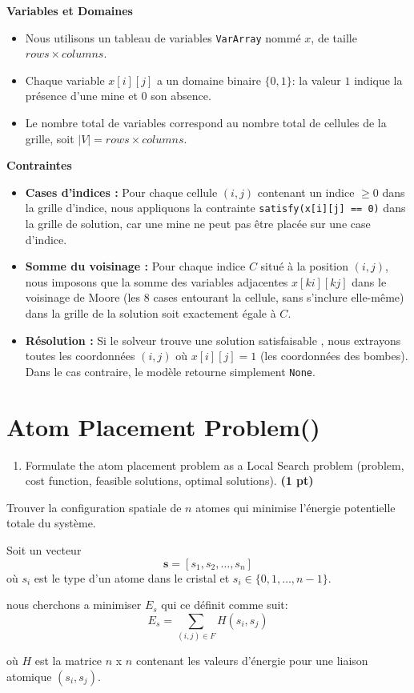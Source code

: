 \documentclass[11pt,a4paper]{report}
\begin{document}
\begin{answers}[10cm]
    \textbf{Variables et Domaines}
    \begin{itemize}
        \item Nous utilisons un tableau de variables \texttt{VarArray} nommé $x$, de taille $rows \times columns$.
        \item Chaque variable $x[i][j]$ a un domaine binaire $\{0, 1\}$: la valeur $1$ indique la présence d'une mine et $0$ son absence.
        \item Le nombre total de variables correspond au nombre total de cellules de la grille, soit $|V| = rows \times columns$.
    \end{itemize}

    \textbf{Contraintes}
    \begin{itemize}
        \item \textbf{Cases d'indices  :} Pour chaque cellule $(i, j)$ contenant un indice $\geq 0$ dans la grille d'indice, nous appliquons la contrainte \texttt{satisfy(x[i][j] == 0)} dans la grille de solution, car une mine ne peut pas être placée sur une case d'indice.
        \item \textbf{Somme du voisinage :} Pour chaque indice $C$ situé à la position $(i, j)$, nous imposons que la somme des variables adjacentes $x[ki][kj]$ dans le voisinage de Moore (les 8 cases entourant la cellule, sans s'inclure elle-même) dans la grille de la solution soit exactement égale à $C$.   
        \item \textbf{Résolution :} Si le solveur trouve une solution satisfaisable , nous extrayons toutes les coordonnées $(i, j)$ où $x[i][j] = 1$ (les coordonnées des bombes). Dans le cas contraire, le modèle retourne simplement \texttt{None}.
    \end{itemize}
\end{answers}




\newpage
\section{Atom Placement Problem()}
\begin{enumerate}
\item Formulate the atom placement problem as a Local Search problem (problem, cost function, feasible solutions, optimal solutions). \textbf{(1 pt)}
\end{enumerate}

\begin{answers}[6cm]

Trouver la configuration spatiale de $n$ atomes qui minimise l'énergie potentielle totale du système.

Soit un vecteur 
\[
\mathbf{s} = [s_1, s_2, \dots, s_n]
\] 
où $s_i$ est le type d'un atome dans le cristal et $s_i \in \{0, 1, \dots, n-1\}$.

nous cherchons a minimiser $E_s$ qui ce définit comme suit:
\[
E_s = \sum_{(i,j)\in F} H(s_i, s_j)
\]

où $H$ est la matrice $n$ x $n$ contenant les valeurs d'énergie pour une liaison atomique $(s_i, s_j)$.

\end{answers}
\end{document}
